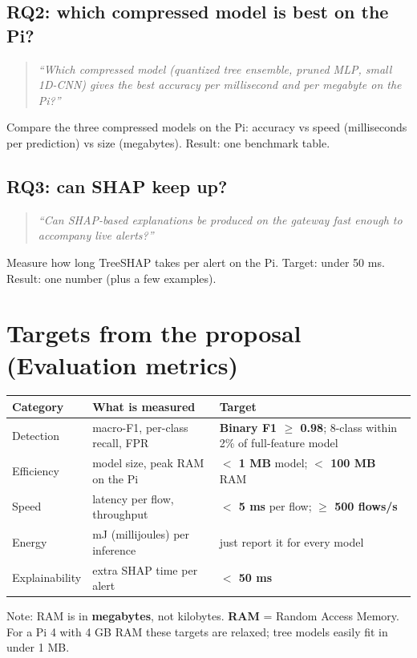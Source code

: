 \documentclass[11pt]{article}
\newcommand{\q}[1]{\begin{quote}\itshape ``#1''\end{quote}}
\begin{document}
\subsection*{RQ2: which compressed model is best on the Pi?}
\q{Which compressed model (quantized tree ensemble, pruned MLP, small 1D-CNN) gives the best accuracy per millisecond and per megabyte on the Pi?}
Compare the three compressed models on the Pi: accuracy vs speed (milliseconds per prediction) vs size (megabytes). Result: one benchmark table.

\subsection*{RQ3: can SHAP keep up?}
\q{Can SHAP-based explanations be produced on the gateway fast enough to accompany live alerts?}
Measure how long TreeSHAP takes per alert on the Pi. Target: under 50 ms. Result: one number (plus a few examples).

\section{Targets from the proposal (Evaluation metrics)}
\begin{center}
\begin{tabular}{@{}l >{\raggedright}p{4.6cm} >{\raggedright\arraybackslash}p{7.6cm}@{}}
\toprule
\textbf{Category} & \textbf{What is measured} & \textbf{Target} \\
\midrule
Detection & macro-F1, per-class recall, FPR & \textbf{Binary F1 $\geq$ 0.98}; 8-class within 2\% of full-feature model \\
Efficiency & model size, peak RAM on the Pi & \textbf{$<$ 1 MB} model; \textbf{$<$ 100 MB} RAM \\
Speed & latency per flow, throughput & \textbf{$<$ 5 ms} per flow; \textbf{$\geq$ 500 flows/s} \\
Energy & mJ (millijoules) per inference & just report it for every model \\
Explainability & extra SHAP time per alert & \textbf{$<$ 50 ms} \\
\bottomrule
\end{tabular}
\end{center}
Note: RAM is in \textbf{megabytes}, not kilobytes. \textbf{RAM} = Random Access Memory. For a Pi 4 with 4 GB RAM these targets are relaxed;
tree models easily fit in under 1 MB.

\newpage
\end{document}
